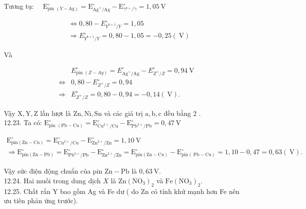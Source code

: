 \documentclass[10pt]{article}
\begin{document}
Tương tụ: $\quad \mathrm{E}_{\text {pin }(Y-\mathrm{Ag})}^{\circ}=\mathrm{E}_{\mathrm{Ag}^{+} / \mathrm{Ag}}^{\circ}-\mathrm{E}_{\gamma^{b+} / \gamma}^{\circ}=1,05 \mathrm{~V}$

$$
\begin{aligned}
& \Leftrightarrow 0,80-E_{Y^{b+1} / Y}^{\circ}=1,05 \\
& \Rightarrow E_{Y^{b+1} / Y}^{\circ}=0,80-1,05=-0,25(\mathrm{~V})
\end{aligned}
$$

Và

$$
\begin{aligned}
& E_{\text {pin }(Z-A g)}^{\circ}=E_{\mathrm{Ag}^{+} / \mathrm{Ag}}^{\circ}-E_{Z^{+} / Z}^{\circ}=0,94 \mathrm{~V} \\
\Leftrightarrow & 0,80-E_{Z^{+} / Z}^{\circ}=0,94 \\
\Rightarrow & E_{Z^{+} / Z}^{\circ}=0,80-0,94=-0,14(\mathrm{~V}) .
\end{aligned}
$$

Vậy $\mathrm{X}, \mathrm{Y}, \mathrm{Z}$ lần lượt là $\mathrm{Zn}, \mathrm{Ni}, \mathrm{Sn}$ và các giá trị $\mathrm{a}, \mathrm{b}, \mathrm{c}$ đều bằng 2 .\\
12.23. Ta có: $\mathrm{E}_{\text {pin }(\mathrm{Pb}-\mathrm{Cu})}^{\circ}=\mathrm{E}_{\mathrm{Cu}^{2+} / \mathrm{Cu}}^{\circ}-\mathrm{E}_{\mathrm{Pb}^{2+} / \mathrm{Pb}}^{\circ}=0,47 \mathrm{~V}$

$$
\begin{gathered}
\mathrm{E}_{\mathrm{pin}(\mathrm{Zn}-\mathrm{Cu})}^{\circ}=\mathrm{E}_{\mathrm{Cu}^{2+} / \mathrm{Cu}}^{\circ}-\mathrm{E}_{\mathrm{Zn}^{2+} / \mathrm{Zn}}^{\circ}=1,10 \mathrm{~V} \\
\Rightarrow \mathrm{E}_{\mathrm{pin}(\mathrm{Zn}-\mathrm{Pb})}^{\circ}=\mathrm{E}_{\mathrm{Pb}^{2+} / \mathrm{Pb}}^{\circ}-\mathrm{E}_{\mathrm{Zn}^{2+} / \mathrm{Zn}}^{\circ}=\mathrm{E}_{\mathrm{pin}(\mathrm{Zn}-\mathrm{Cu})}^{\circ}-\mathrm{E}_{\mathrm{pin}(\mathrm{~Pb}-\mathrm{Cu})}^{\circ}=1,10-0,47=0,63(\mathrm{~V}) .
\end{gathered}
$$

Vậy sức điện động chuẩn của pin $\mathrm{Zn}-\mathrm{Pb}$ là $0,63 \mathrm{~V}$.\\
12.24. Hai muối trong dung dịch $X$ là $\mathrm{Zn}\left(\mathrm{NO}_{3}\right)_{2}$ và $\mathrm{Fe}\left(\mathrm{NO}_{3}\right)_{2}$.\\
12.25. Chất rắn Y bao gồm Ag và Fe dư ( do Zn có tính khử mạnh hơn Fe nên ưu tiên phản ứng trước).
\end{document}
